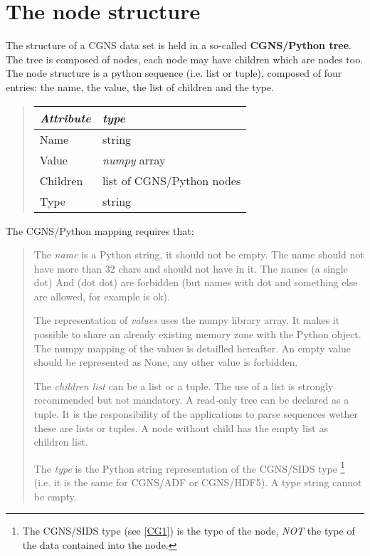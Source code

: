 \documentclass[a4paper,10pt,english]{sphinxmanual}
\begin{document}
\section{The node structure}
\label{sids-to-python:the-node-structure}
The structure of a CGNS data set is held in a so-called \textbf{CGNS/Python tree}.
The tree is composed of nodes, each node may have children which are nodes
too. The node structure is a python sequence (i.e. list or tuple), composed
of four entries: the name, the value, the list of children and the type.
\begin{quote}

\begin{tabulary}{\linewidth}{|L|L|}
\hline
\textbf{
\emph{Attribute}
} & \textbf{
\emph{type}
}\\
\hline

Name
 & 
string
\\

Value
 & 
\emph{numpy} array
\\

Children
 & 
list of CGNS/Python nodes
\\

Type
 & 
string
\\
\hline
\end{tabulary}

\end{quote}

The CGNS/Python mapping requires that:
\begin{quote}

The \emph{name} is a Python string, it should not be empty. The name should
not have more than 32 chars and should not have \code{/} in it. The names
 (a single dot) And  (dot dot) are forbidden (but names with dot
and something else are allowed, for example  is ok).

The representation of \emph{values} uses the numpy library array. It makes
it possible to share an already existing memory zone with
the Python object. The numpy mapping of the values is detailled
hereafter. An empty value should be represented as None, any other
value is forbidden.

The \emph{children list} can be a list or a tuple. The use of a list is
strongly recommended but not mandatory. A read-only tree can be
declared as a tuple. It is the responsibility of the applications to
parse sequences wether these are lists or tuples. A node without child
has the empty list \code{{[}{]}} as children list.

The \emph{type} is the Python string representation of the CGNS/SIDS type \footnote{
The CGNS/SIDS type (see {\hyperref[sids-to-python:cg1]{{[}CG1{]}}}) is the type of the node, \emph{NOT} the
type of the data contained into the node.
}
(i.e. it is the same for CGNS/ADF or CGNS/HDF5). A type string cannot be
empty.
\end{quote}
\end{document}

